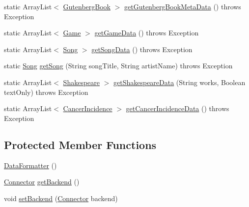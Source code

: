 \begin{DoxyCompactItemize}
\item 
static Array\+List$<$ \hyperlink{classbridges_1_1data__src__dependent_1_1_gutenberg_book}{Gutenberg\+Book} $>$ \hyperlink{classbridges_1_1connect_1_1_data_formatter_a4bd21bd830238db40b511474afc77b61}{get\+Gutenberg\+Book\+Meta\+Data} ()  throws Exception 
\item 
static Array\+List$<$ \hyperlink{classbridges_1_1data__src__dependent_1_1_game}{Game} $>$ \hyperlink{classbridges_1_1connect_1_1_data_formatter_a4098317468be22b4284156d6cd2212e1}{get\+Game\+Data} ()  throws Exception 
\item 
static Array\+List$<$ \hyperlink{classbridges_1_1data__src__dependent_1_1_song}{Song} $>$ \hyperlink{classbridges_1_1connect_1_1_data_formatter_a6a2ded4ccec11234434b83a3e408fb67}{get\+Song\+Data} ()  throws Exception 
\item 
static \hyperlink{classbridges_1_1data__src__dependent_1_1_song}{Song} \hyperlink{classbridges_1_1connect_1_1_data_formatter_ad1d2071025ce9daa42ab69af8eb4749b}{get\+Song} (String song\+Title, String artist\+Name)  throws Exception 
\item 
static Array\+List$<$ \hyperlink{classbridges_1_1data__src__dependent_1_1_shakespeare}{Shakespeare} $>$ \hyperlink{classbridges_1_1connect_1_1_data_formatter_ac090a4d67b38b9649bf811906f9a630a}{get\+Shakespeare\+Data} (String works, Boolean text\+Only)  throws Exception 
\item 
static Array\+List$<$ \hyperlink{classbridges_1_1data__src__dependent_1_1_cancer_incidence}{Cancer\+Incidence} $>$ \hyperlink{classbridges_1_1connect_1_1_data_formatter_af26cb09a93bf326fe14ad8fecf46b4f8}{get\+Cancer\+Incidence\+Data} ()  throws Exception 
\end{DoxyCompactItemize}
\subsection*{Protected Member Functions}
\begin{DoxyCompactItemize}
\item 
\hyperlink{classbridges_1_1connect_1_1_data_formatter_a31efd2251e98942e58e743dff213ef27}{Data\+Formatter} ()
\item 
\hyperlink{classbridges_1_1connect_1_1_connector}{Connector} \hyperlink{classbridges_1_1connect_1_1_data_formatter_a29cf4c2b0c5629d63a76b60569355c65}{get\+Backend} ()
\item 
void \hyperlink{classbridges_1_1connect_1_1_data_formatter_af9b878e5c092234a6ab5f8c11bee1fbd}{set\+Backend} (\hyperlink{classbridges_1_1connect_1_1_connector}{Connector} backend)
\end{DoxyCompactItemize}



